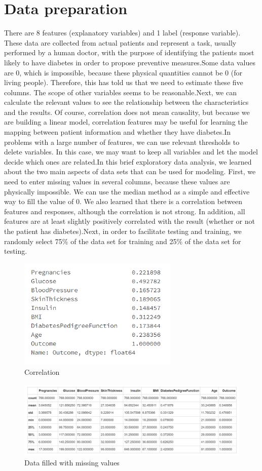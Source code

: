 \documentclass[runningheads]{llncs}
\begin{document}
\section{Data preparation}
There are 8 features (explanatory variables) and 1 label (response variable). These data are collected from actual patients and represent a task, usually performed by a human doctor, with the purpose of identifying the patients most likely to have diabetes in order to propose preventive measures.Some data values are 0, which is impossible, because these physical quantities cannot be 0 (for living people). Therefore, this has told us that we need to estimate these five columns. The scope of other variables seems to be reasonable.Next, we can calculate the relevant values to see the relationship between the characteristics and the results. Of course, correlation does not mean causality, but because we are building a linear model, correlation features may be useful for learning the mapping between patient information and whether they have diabetes.In problems with a large number of features, we can use relevant thresholds to delete variables. In this case, we may want to keep all variables and let the model decide which ones are related.In this brief exploratory data analysis, we learned about the two main aspects of data sets that can be used for modeling. First, we need to enter missing values in several columns, because these values are physically impossible. We can use the median method as a simple and effective way to fill the value of 0. We also learned that there is a correlation between features and responses, although the correlation is not strong. In addition, all features are at least slightly positively correlated with the result (whether or not the patient has diabetes).Next, in order to facilitate testing and training, we randomly select 75\% of the data set for training and 25\% of the data set for testing.
\begin{figure}[H]
\centering
\includegraphics[width=3in]{1-2.png}
\caption{Correlation}
\end{figure}
\begin{figure}[H]
\centering
\includegraphics[width=6in]{1-1.png}
\caption{Data filled with missing values}
\end{figure}
\clearpage
\end{document}
